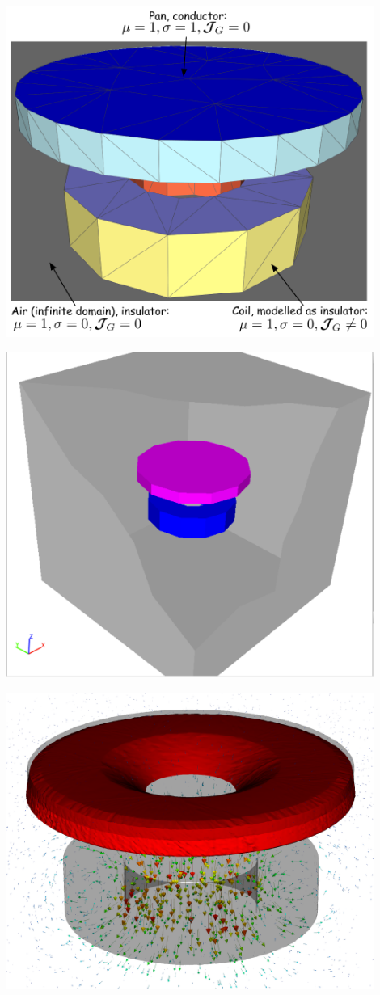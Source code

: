 \documentclass[xcolor=dvipsnames]{beamer}
\begin{document}
\begin {frame} [t]
{%
 \centerline{\includegraphics [width=0.9\textwidth] {coil_and_pan_v3_res.pdf}}
}
{%
 \centerline{\includegraphics [width=0.9\textwidth] {Pan-Scheme.pdf}}
}
{%
 \centerline{\includegraphics [width=0.9\textwidth] {PanSolution3d-coil_and_pan_v3-lev4.pdf}}
}
\end{frame}
\end{document}
